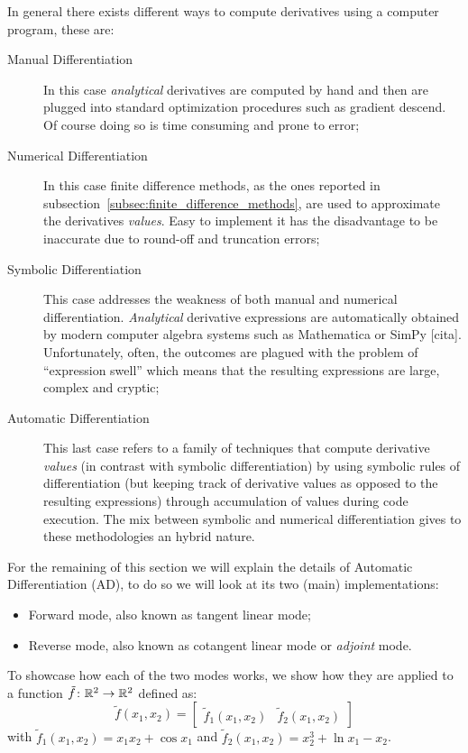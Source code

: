 In general there exists different ways to compute derivatives using a computer program, these are:
\begin{description}
	\item[Manual Differentiation] In this case \emph{analytical} derivatives are computed by hand and then are plugged into standard optimization procedures such as gradient descend. Of course doing so is time consuming and prone to error;
	
	\item[Numerical Differentiation] In this case finite difference methods, as the ones reported in subsection~\vref{subsec:finite_difference_methods}, are used to approximate the derivatives \emph{values}. Easy to implement it has the disadvantage to be inaccurate due to round-off and truncation errors;

	\item[Symbolic Differentiation] This case addresses the weakness of both manual and numerical differentiation. \emph{Analytical} derivative expressions are automatically obtained by modern computer algebra systems such as Mathematica or SimPy [cita]. Unfortunately, often, the outcomes are plagued with the problem of ``expression swell'' which means that the resulting expressions are large, complex and cryptic;
	\item[Automatic Differentiation] This last case refers to a family of techniques that compute derivative \emph{values} (in contrast with symbolic differentiation) by using symbolic rules of differentiation (but keeping track of derivative values as opposed to the resulting
	expressions) through accumulation of values during code execution. The mix between symbolic and numerical differentiation gives to these methodologies an hybrid nature.
\end{description}

For the remaining of this section we will explain the details of Automatic Differentiation (AD), to do so we will look at its two (main) implementations:
\begin{itemize}
	\item Forward mode, also known as tangent linear mode;
	\item Reverse mode, also known as cotangent linear mode or \emph{adjoint} mode.
\end{itemize}
To showcase how each of the two modes works, we show how they are applied to a function $\tilde{f} \colon \mathbb{R}^2 \to \mathbb{R}^2$ defined as:
\begin{equation}
	\label{eqn:example_function_for_AD}
	\tilde{f}(x_1, x_2) = \begin{bmatrix}
					\tilde{f}_1(x_1, x_2)  &  \tilde{f}_2(x_1, x_2)
				  \end{bmatrix}
\end{equation}
with $\tilde{f}_1(x_1, x_2) = x_1 x_2 + \cos x_1$ and $\tilde{f}_2(x_1, x_2) = x_2^3 + \ln x_1 - x_2$.

